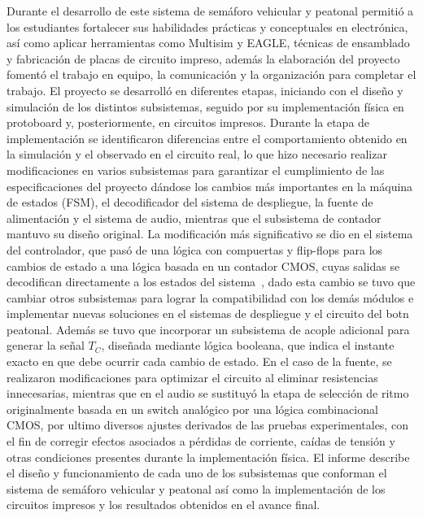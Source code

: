 \documentclass[12pt,onecolumn]{IEEEtran}
\begin{document}
Durante el desarrollo de este sistema de semáforo vehicular y peatonal permitió a los estudiantes fortalecer sus habilidades prácticas y conceptuales en electrónica, así como aplicar herramientas como Multisim y EAGLE, técnicas de ensamblado y fabricación de placas de circuito impreso, además la elaboración del proyecto fomentó el trabajo en equipo, la comunicación y la organización para completar el trabajo. 
El proyecto se desarrolló en diferentes etapas, iniciando con el diseño y simulación de los distintos subsistemas, seguido por su implementación física en protoboard y, posteriormente, en circuitos impresos. Durante la etapa de implementación se identificaron diferencias entre el comportamiento obtenido en la simulación y el observado en el circuito real, lo que hizo necesario realizar modificaciones en varios subsistemas para garantizar el cumplimiento de las especificaciones del proyecto dándose los cambios más importantes en la máquina de estados (FSM), el decodificador del sistema de despliegue, la fuente de alimentación y el sistema de audio, mientras que el subsistema de contador mantuvo su diseño original.
La modificación más significativo se dio en el sistema del controlador, que pasó de una lógica con compuertas y flip-flops para los cambios de estado a una lógica basada en un contador CMOS, cuyas salidas se decodifican directamente a los estados del sistema~\cite{harris_digital}, dado esta cambio se tuvo que cambiar otros subsistemas para lograr la compatibilidad con los demás módulos e implementar nuevas soluciones en el sistemas de despliegue y el circuito del botn peatonal. Además se tuvo que incorporar un subsistema de acople adicional para generar la señal $T_C$, diseñada mediante lógica booleana, que indica el instante exacto en que debe ocurrir cada cambio de estado. En el caso de la fuente, se realizaron modificaciones para optimizar el circuito al eliminar resistencias innecesarias, mientras que en el audio se sustituyó la etapa de selección de ritmo originalmente basada en un switch analógico por una lógica combinacional CMOS, por ultimo diversos ajustes derivados de las pruebas experimentales, con el fin de corregir efectos asociados a pérdidas de corriente, caídas de tensión y otras condiciones presentes durante la implementación física.
El informe describe el diseño y funcionamiento de cada uno de los subsistemas que conforman el sistema de semáforo vehicular y peatonal así como la implementación de los circuitos impresos y los resultados obtenidos en el avance final.


\end{document}
